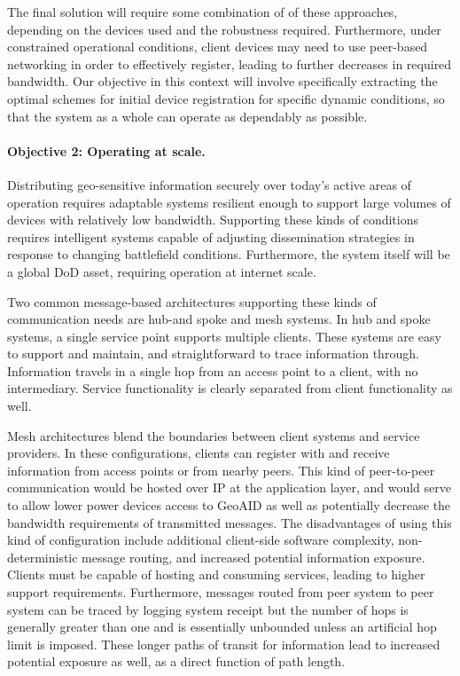 \documentclass{sbir}
\begin{document}
The final solution will require some combination of of these approaches, depending on the devices used and the robustness required.  Furthermore, under constrained operational conditions, client devices may need to use peer-based networking in order to effectively register, leading to further decreases in required bandwidth.  Our objective in this context will involve specifically extracting the optimal schemes for initial device registration for specific dynamic conditions, so that the system as a whole can operate as dependably as possible.

\paragraph{Objective 2: Operating at scale.} Distributing geo-sensitive information securely over today's active areas of operation requires adaptable systems resilient enough to support large volumes of devices with relatively low bandwidth.  Supporting these kinds of conditions requires intelligent systems capable of adjusting dissemination strategies in response to changing battlefield conditions.  Furthermore, the system itself will be a global DoD asset, requiring operation at internet scale.

Two common message-based architectures supporting these kinds of communication needs are hub-and spoke and mesh systems.  In hub and spoke systems, a single service point supports multiple clients.  These systems are easy to support and maintain, and straightforward to trace information through.  Information travels in a single hop from an access point to a client, with no intermediary.  Service functionality is clearly separated from client functionality as well.

Mesh architectures blend the boundaries between client systems and service providers.  In these configurations, clients can register with and receive information from access points or from nearby peers.  This kind of peer-to-peer communication would be hosted over IP at the application layer, and would serve to allow lower power devices access to GeoAID as well as potentially decrease the bandwidth requirements of transmitted messages.  The disadvantages of using this kind of configuration include additional client-side software complexity, non-deterministic message routing, and increased potential information exposure.  Clients must be capable of hosting and consuming services, leading to higher support requirements.  Furthermore, messages routed from peer system to peer system can be traced by logging system receipt but the number of hops is generally greater than one and is essentially unbounded unless an artificial hop limit is imposed.  These longer paths of transit for information lead to increased potential exposure as well, as a direct function of path length.
\end{document}
